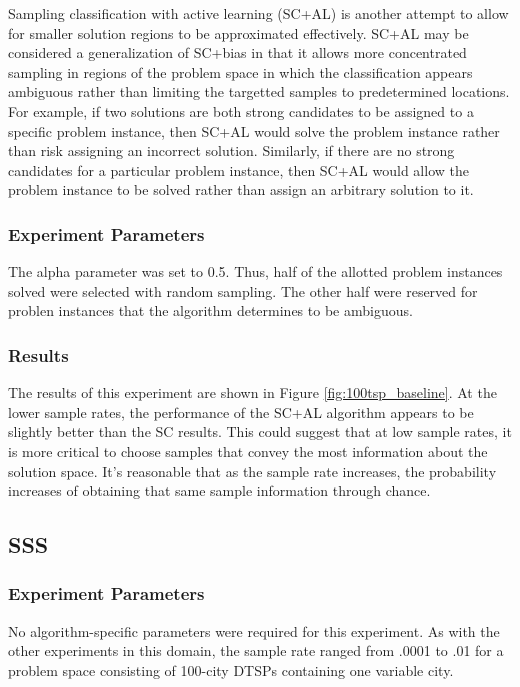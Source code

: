 Sampling classification with active learning (SC+AL) is another attempt to allow for smaller solution regions to be approximated effectively.  SC+AL may be considered a generalization of SC+bias in that it allows more concentrated sampling in regions of the problem space in which the classification appears ambiguous rather than limiting the targetted samples to predetermined locations.  For example, if two solutions are both strong candidates to be assigned to a specific problem instance, then SC+AL would solve the problem instance rather than risk assigning an incorrect solution.  Similarly, if there are no strong candidates for a particular problem instance, then SC+AL would allow the problem instance to be solved rather than assign an arbitrary solution to it.  

\subsubsection{Experiment Parameters}  The alpha parameter was set to 0.5.  Thus, half of the allotted problem instances solved were selected with random sampling.  The other half were reserved for problen instances that the algorithm determines to be ambiguous.

\subsubsection{Results} The results of this experiment are shown in Figure \ref{fig:100tsp_baseline}.  At the lower sample rates, the performance of the SC+AL algorithm appears to be slightly better than the SC results.  This could suggest that at low sample rates, it is more critical to choose samples that convey the most information about the solution space.  It's reasonable that as the sample rate increases, the probability increases of obtaining that same sample information through chance.


\subsection{SSS} 

\subsubsection{Experiment Parameters}  No algorithm-specific parameters were required for this experiment.  As with the other experiments in this domain, the sample rate ranged from .0001 to .01 for a problem space consisting of 100-city DTSPs containing one variable city.

